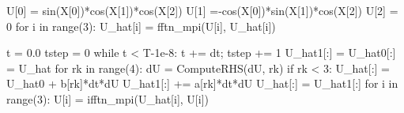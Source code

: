 \documentclass[11pt, oneside]{article}
\begin{document}
\begin{python}
U[0] = sin(X[0])*cos(X[1])*cos(X[2])
U[1] =-cos(X[0])*sin(X[1])*cos(X[2])
U[2] = 0
for i in range(3):
    U_hat[i] = fftn_mpi(U[i], U_hat[i])

t = 0.0
tstep = 0
while t < T-1e-8:
    t += dt; tstep += 1
    U_hat1[:] = U_hat0[:] = U_hat
    for rk in range(4):
        dU = ComputeRHS(dU, rk)
        if rk < 3: U_hat[:] = U_hat0 + b[rk]*dt*dU
        U_hat1[:] += a[rk]*dt*dU
    U_hat[:] = U_hat1[:]
    for i in range(3):
        U[i] = ifftn_mpi(U_hat[i], U[i])
        
\end{python}
\end{document}
